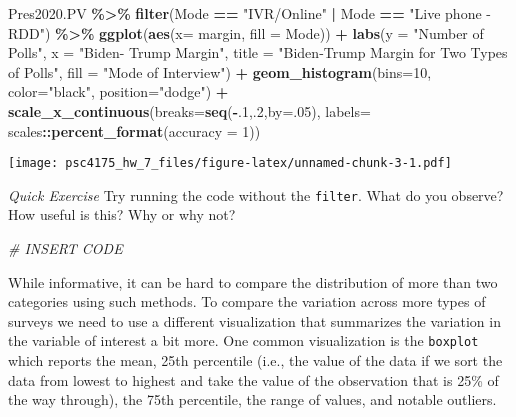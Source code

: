 \documentclass[
]{article}
\newenvironment{Shaded}{\begin{snugshade}}{\end{snugshade}}
\newcommand{\AttributeTok}[1]{\textcolor[rgb]{0.13,0.29,0.53}{#1}}
\newcommand{\CommentTok}[1]{\textcolor[rgb]{0.56,0.35,0.01}{\textit{#1}}}
\newcommand{\DecValTok}[1]{\textcolor[rgb]{0.00,0.00,0.81}{#1}}
\newcommand{\FunctionTok}[1]{\textcolor[rgb]{0.13,0.29,0.53}{\textbf{#1}}}
\newcommand{\NormalTok}[1]{#1}
\newcommand{\SpecialCharTok}[1]{\textcolor[rgb]{0.81,0.36,0.00}{\textbf{#1}}}
\newcommand{\StringTok}[1]{\textcolor[rgb]{0.31,0.60,0.02}{#1}}
\begin{document}
\begin{Shaded}
\begin{Highlighting}[]
\NormalTok{Pres2020.PV }\SpecialCharTok{\%\textgreater{}\%} 
  \FunctionTok{filter}\NormalTok{(Mode }\SpecialCharTok{==} \StringTok{"IVR/Online"} \SpecialCharTok{|}\NormalTok{ Mode }\SpecialCharTok{==} \StringTok{"Live phone {-} RDD"}\NormalTok{) }\SpecialCharTok{\%\textgreater{}\%}
    \FunctionTok{ggplot}\NormalTok{(}\FunctionTok{aes}\NormalTok{(}\AttributeTok{x=}\NormalTok{ margin, }\AttributeTok{fill =}\NormalTok{ Mode)) }\SpecialCharTok{+}     
  \FunctionTok{labs}\NormalTok{(}\AttributeTok{y =} \StringTok{"Number of Polls"}\NormalTok{,}
         \AttributeTok{x =} \StringTok{"Biden{-} Trump Margin"}\NormalTok{,}
         \AttributeTok{title =} \StringTok{"Biden{-}Trump Margin for Two Types of Polls"}\NormalTok{,}
        \AttributeTok{fill =} \StringTok{"Mode of Interview"}\NormalTok{) }\SpecialCharTok{+}
    \FunctionTok{geom\_histogram}\NormalTok{(}\AttributeTok{bins=}\DecValTok{10}\NormalTok{, }\AttributeTok{color=}\StringTok{"black"}\NormalTok{, }\AttributeTok{position=}\StringTok{"dodge"}\NormalTok{) }\SpecialCharTok{+} 
    \FunctionTok{scale\_x\_continuous}\NormalTok{(}\AttributeTok{breaks=}\FunctionTok{seq}\NormalTok{(}\SpecialCharTok{{-}}\NormalTok{.}\DecValTok{1}\NormalTok{,.}\DecValTok{2}\NormalTok{,}\AttributeTok{by=}\NormalTok{.}\DecValTok{05}\NormalTok{),}
                     \AttributeTok{labels=}\NormalTok{ scales}\SpecialCharTok{::}\FunctionTok{percent\_format}\NormalTok{(}\AttributeTok{accuracy =} \DecValTok{1}\NormalTok{))}
\end{Highlighting}
\end{Shaded}

\texttt{[image: psc4175\_hw\_7\_files/figure-latex/unnamed-chunk-3-1.pdf]}

\emph{Quick Exercise} Try running the code without the \texttt{filter}.
What do you observe? How useful is this? Why or why not?

\begin{Shaded}
\begin{Highlighting}[]
\CommentTok{\# INSERT CODE}
\end{Highlighting}
\end{Shaded}

While informative, it can be hard to compare the distribution of more
than two categories using such methods. To compare the variation across
more types of surveys we need to use a different visualization that
summarizes the variation in the variable of interest a bit more. One
common visualization is the \texttt{boxplot} which reports the mean,
25th percentile (i.e., the value of the data if we sort the data from
lowest to highest and take the value of the observation that is 25\% of
the way through), the 75th percentile, the range of values, and notable
outliers.
\end{document}
